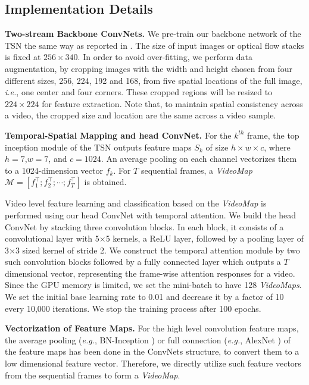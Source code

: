 \documentclass[english, 10pt, twocolumn, twoside]{IEEEtran}
\begin{document}
\subsection{Implementation Details}
\noindent\textbf{Two-stream Backbone ConvNets.}
We pre-train our backbone network of the TSN the same way as reported in \cite{wang2016temporal}. The size of input images or optical flow stacks is fixed at $256\times340$. In order to avoid over-fitting, we perform data augmentation, by cropping images with the width and height chosen from four different sizes, 256, 224, 192 and 168, from five spatial locations of the full image, \emph{i.e.}, one center and four corners. These cropped regions will be resized to $224\times224$ for feature extraction. Note that, to maintain spatial consistency across a video, the cropped size and location are the same across a video sample.





\noindent\textbf{Temporal-Spatial Mapping and head ConvNet.} For the $k^{th}$ frame, the top inception module of the TSN outputs feature maps $S_k$ of size $h\times w\times c$, where $h=7$,$w=7$, and $c=1024$. An average pooling on each channel vectorizes them to a 1024-dimension vector $f_k$. For $T$ sequential frames, a \emph{VideoMap} $\mathcal{M} = [f_1^{\top}; f_2^{\top}; \cdots; f_T^{\top}]$ is obtained.

Video level feature learning and classification based on the \emph{VideoMap} is performed using our head ConvNet with temporal attention. We build the head ConvNet by stacking three convolution blocks. In each block, it consists of a convolutional layer with 5$\times$5 kernels, a ReLU layer, followed by a pooling layer of 3$\times$3 sized kernel of stride 2. We construct the temporal attention module by two such convolution blocks followed by a fully connected layer which outputs a $T$ dimensional vector, representing the frame-wise attention responses for a video. Since the GPU memory is limited, we set the mini-batch to have 128 \emph{VideoMaps}. We set the initial base learning rate to 0.01 and decrease it by a factor of 10 every 10,000 iterations. We stop the training process after 100 epochs.



\noindent\textbf{Vectorization of Feature Maps.} For the high level convolution feature maps, the average pooling (\emph{e.g.}, BN-Inception \cite{wang2016temporal}) or full connection (\emph{e.g.}, AlexNet \cite{simonyan2014two}) of the feature maps has been done in the ConvNets structure, to convert them to a low dimensional feature vector. Therefore, we directly utilize such feature vectors from the sequential frames to form a \emph{VideoMap}.
\end{document}
